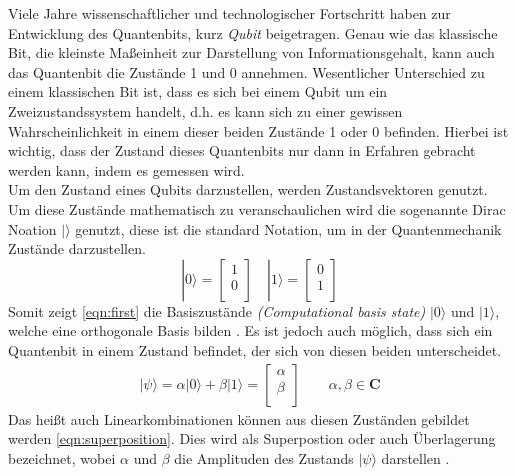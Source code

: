 Viele Jahre wissenschaftlicher und technologischer Fortschritt haben zur Entwicklung des Quantenbits, kurz \textit{Qubit} beigetragen. Genau wie das klassische Bit, die kleinste Ma\ss einheit zur Darstellung von Informationsgehalt, kann auch das Quantenbit die Zust\"ande 1 und 0 annehmen. Wesentlicher Unterschied zu einem klassischen Bit ist, dass es sich bei einem Qubit um ein Zweizustandssystem handelt, d.h. es kann sich zu einer gewissen Wahrscheinlichkeit in einem dieser beiden Zust\"ande 1 oder 0 befinden. Hierbei ist wichtig, dass der Zustand dieses Quantenbits nur dann in Erfahren gebracht werden kann, indem es gemessen wird.\\
Um den Zustand eines Qubits darzustellen, werden Zustandsvektoren genutzt. Um diese Zust\"ande mathematisch zu veranschaulichen wird die sogenannte Dirac Noation $|\rangle$ genutzt, diese ist die standard Notation, um in der Quantenmechanik Zust\"ande darzustellen.
\begin{equation} \label{eqn:first}
        |0\rangle = \begin{bmatrix}
        1 \\
        0 \\
        \end{bmatrix}
        \,\,\, \,\,\,
        |1\rangle = \begin{bmatrix}
        0 \\
        1 \\
        \end{bmatrix}
\end{equation}
Somit zeigt \ref{eqn:first} die Basiszust\"ande \textit{(Computational basis state)} $|0\rangle$ und $|1\rangle$, welche eine orthogonale Basis bilden \cite{nielsen_chuang_2010}. Es ist jedoch auch m\"oglich, dass sich ein Quantenbit in einem Zustand befindet, der sich von diesen beiden unterscheidet.
\begin{equation}\label{eqn:superposition}
\begin{gathered}
        |\psi\rangle = \alpha |0\rangle+\beta |1\rangle = \begin{bmatrix}
        \alpha \\
        \beta \\
        \end{bmatrix} \qquad \alpha, \beta \in \mathbf{C}
        \end{gathered}
\end{equation}
Das hei\ss t auch Linearkombinationen k\"onnen aus diesen Zust\"anden gebildet werden \ref{eqn:superposition}. Dies wird als Superpostion oder auch \"Uberlagerung bezeichnet, wobei $\alpha$ und $\beta$ die Amplituden des Zustands $|\psi\rangle$ darstellen \cite{nielsen_chuang_2010}. \\
